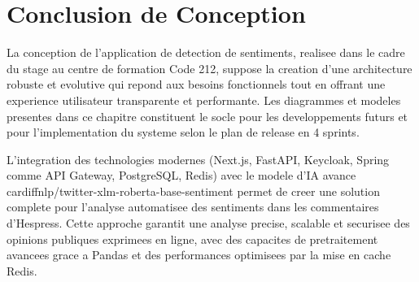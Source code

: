 \section{Conclusion de Conception}

La conception de l'application de detection de sentiments, realisee dans le cadre du stage au centre de formation Code 212, suppose la creation d'une architecture robuste et evolutive qui repond aux besoins fonctionnels tout en offrant une experience utilisateur transparente et performante. Les diagrammes et modeles presentes dans ce chapitre constituent le socle pour les developpements futurs et pour l'implementation du systeme selon le plan de release en 4 sprints.

L'integration des technologies modernes (Next.js, FastAPI, Keycloak, Spring comme API Gateway, PostgreSQL, Redis) avec le modele d'IA avance cardiffnlp/twitter-xlm-roberta-base-sentiment permet de creer une solution complete pour l'analyse automatisee des sentiments dans les commentaires d'Hespress. Cette approche garantit une analyse precise, scalable et securisee des opinions publiques exprimees en ligne, avec des capacites de pretraitement avancees grace a Pandas et des performances optimisees par la mise en cache Redis.

